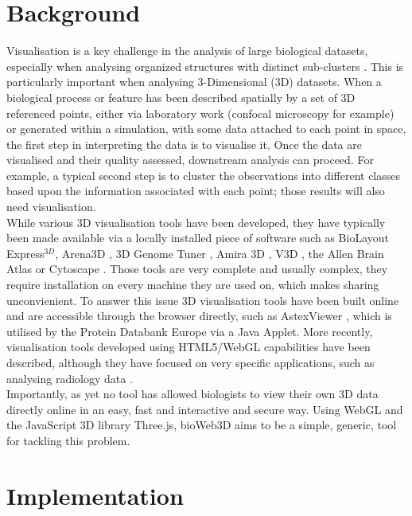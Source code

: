 \documentclass[10pt]{bmc_article}
\newenvironment{bmcformat}{\baselineskip20pt\sloppy\setboolean{publ}{false}}{\baselineskip20pt\sloppy}
\begin{document}
\begin{bmcformat}
\section{Background}

Visualisation is a key challenge in the analysis of large biological datasets, especially when analysing organized structures with distinct sub-clusters \cite{Rubel10}. This is particularly important when analysing 3-Dimensional (3D) datasets. When a biological process or feature has been described spatially by a set of 3D referenced points, either via laboratory work (confocal microscopy for example) or generated within a simulation, with some data attached to each point in space, the first step in interpreting the data is to visualise it. Once the data are visualised and their quality assessed, downstream analysis can proceed. For example, a typical second step is to cluster the observations into different classes based upon the information associated with each point; those results will also need visualisation. \\
While various 3D visualisation tools have been developed, they have typically been made available via a locally installed piece of software such as BioLayout Express$^{3D}$\cite{Freeman07}, Arena3D \cite{Pavlopoulos08},  3D Genome Tuner \cite{Wang09}, Amira 3D \cite{Stalling05}, V3D \cite{Peng10}, the Allen Brain Atlas \cite{Lein07} or Cytoscape \cite{Shannon03}. Those tools are very complete and usually complex, they require installation on every machine they are used on, which makes sharing unconvienient. To answer this issue 3D visualisation tools have been built online and are accessible through the browser directly, such as AstexViewer \cite{Hartshorn02}, which is utilised by the Protein Databank Europe via a Java Applet. More recently, visualisation tools developed using HTML5/WebGL capabilities have been described, although they have focused on very specific applications, such as analysing radiology data  \cite{Dinesh12}.\\
Importantly, as yet no tool has allowed biologists to view their own 3D data directly online in an easy, fast and interactive and secure way. Using WebGL and the JavaScript 3D library Three.js, bioWeb3D aims to be a simple, generic, tool for tackling this problem.\\






\section{Implementation}


\end{bmcformat}
\end{document}
